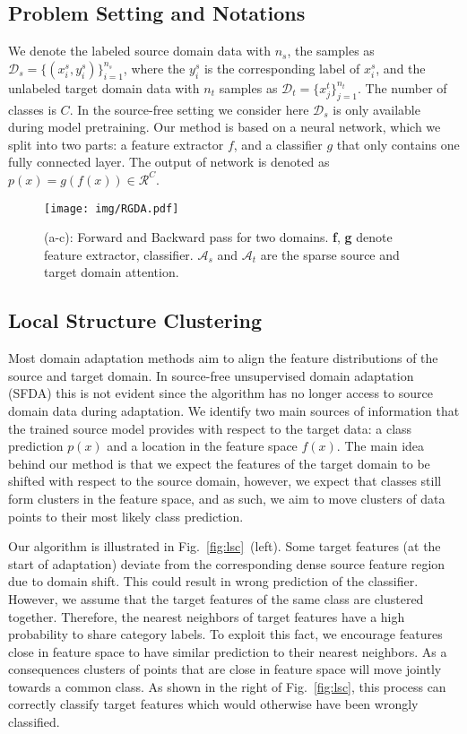 \documentclass[10pt,twocolumn,letterpaper]{article}
\begin{document}
\subsection{Problem Setting and Notations}
We denote the labeled source domain data with $n_s$, the samples as $\mathcal{D}_s = \{(x_i^s,y^s_i)\}_{i=1}^{n_s}$, where the $y^s_i$ is the corresponding label of $x_i^s$, and the unlabeled target domain data with $n_t$ samples as $\mathcal{D}_t=\{x_j^t\}_{j=1}^{n_t}$. The number of classes is $C$. In the source-free setting we consider here $\mathcal{D}_s$ is only available during model pretraining. Our method is based on a neural network, which we split into two parts: a feature extractor $f$, and a classifier $g$ that only contains one fully connected layer. The output of network is denoted as $p(x)=g(f(x)) \in \mathcal{R}^C$. 



\begin{figure*}[t]
	\centering
	\texttt{[image: img/RGDA.pdf]}
	\vspace{-3mm}
	\caption{(a-c): Forward and Backward pass for two domains. \textbf{f}, \textbf{g} denote feature extractor, classifier. $\mathcal{A}_s$ and $\mathcal{A}_t$ are the sparse source and target domain attention.\vspace{-2mm}}
	\label{fig:dal}
	\vspace{-2mm}
\end{figure*}

\subsection{Local Structure Clustering}
\label{sec: lsc}
Most domain adaptation methods aim to align the feature distributions of the source and target domain. In source-free unsupervised domain adaptation (SFDA) this is not evident since the algorithm has no longer access to source domain data during adaptation. We identify two main sources of information that the trained source model provides with respect to the target data: a class prediction $p(x)$ and a location in the feature space $f(x)$. The main idea behind our method is that we expect the features of the target domain to be shifted with respect to the source domain, however, we expect that classes still form clusters in the feature space, and as such, we aim to move clusters of data points to their most likely class prediction. 

Our algorithm is illustrated in Fig.~\ref{fig:lsc}~(left). Some target features (at the start of adaptation) deviate from the corresponding dense source feature region due to domain shift. This could result in wrong prediction of the classifier. However, we assume that the target features of the same class are clustered together. Therefore, the nearest neighbors of target features have a high probability to share category labels. To exploit this fact, we encourage features close in feature space to have similar prediction to their nearest neighbors. As a consequences clusters of points that are close in feature space will move jointly towards a common class. As shown in the right of Fig.~\ref{fig:lsc}, this process can correctly classify target features which would otherwise have been wrongly classified. 
\end{document}
